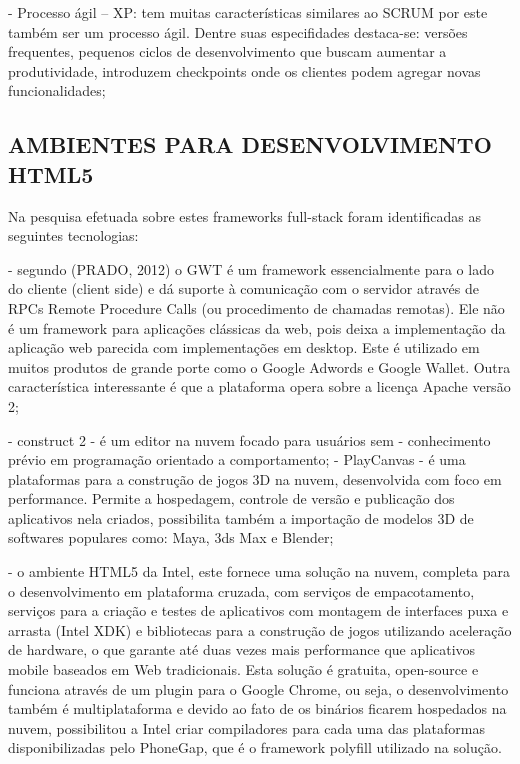 \documentclass[11pt,a4paper]{article}
\begin{document}
- Processo ágil – XP: tem muitas características similares ao SCRUM
por este também ser um processo ágil. Dentre suas especifidades
destaca-se: versões frequentes, pequenos ciclos de desenvolvimento que
buscam aumentar a produtividade, introduzem checkpoints onde os clientes
podem agregar novas funcionalidades;

\subsection{ AMBIENTES PARA DESENVOLVIMENTO HTML5}

Na pesquisa efetuada sobre estes frameworks full-stack foram
identificadas as seguintes tecnologias:

    - segundo (PRADO, 2012) o GWT é um framework essencialmente para
o lado do cliente (client side) e dá suporte à comunicação com
o servidor através de RPCs Remote Procedure Calls (ou procedimento
de chamadas remotas). Ele não é um framework para aplicações
clássicas da web, pois deixa a implementação da aplicação web
parecida com implementações em desktop. Este é utilizado em muitos
produtos de grande porte como o Google Adwords e Google Wallet. Outra
característica interessante é que a plataforma opera sobre a licença
Apache versão 2;

    - construct 2 - é um editor na nuvem focado para usuários sem
    - conhecimento prévio em programação orientado a comportamento;
    - PlayCanvas - é uma plataformas para a construção de jogos 3D
na nuvem, desenvolvida com foco em performance. Permite a hospedagem,
controle de versão e publicação dos aplicativos nela criados,
possibilita também a importação de modelos 3D de softwares populares
como: Maya, 3ds Max e Blender;

    - o ambiente HTML5 da Intel, este fornece uma solução na nuvem,
completa para o desenvolvimento em plataforma cruzada, com serviços de
empacotamento, serviços para a criação e testes de aplicativos com
montagem de interfaces puxa e arrasta (Intel XDK) e bibliotecas para a
construção de jogos utilizando aceleração de hardware, o que garante
até duas vezes mais performance que aplicativos mobile baseados em
Web tradicionais. Esta solução é gratuita, open-source e funciona
através de um plugin para o Google Chrome, ou seja, o desenvolvimento
também é multiplataforma e devido ao fato de os binários ficarem
hospedados na nuvem, possibilitou a Intel criar compiladores para cada
uma das plataformas disponibilizadas pelo PhoneGap, que é o framework
polyfill utilizado na solução.
\end{document}
